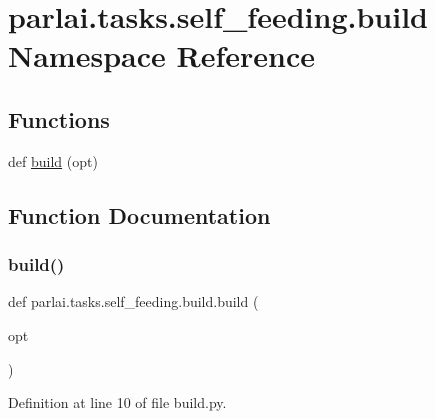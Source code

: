 \hypertarget{namespaceparlai_1_1tasks_1_1self__feeding_1_1build}{}\section{parlai.\+tasks.\+self\+\_\+feeding.\+build Namespace Reference}
\label{namespaceparlai_1_1tasks_1_1self__feeding_1_1build}
\subsection*{Functions}
\begin{DoxyCompactItemize}
\item 
def \hyperlink{namespaceparlai_1_1tasks_1_1self__feeding_1_1build_a59c71646a74f5762ffb019cf79fd9091}{build} (opt)
\end{DoxyCompactItemize}


\subsection{Function Documentation}
\mbox{\label{namespaceparlai_1_1tasks_1_1self__feeding_1_1build_a59c71646a74f5762ffb019cf79fd9091}} 
\subsubsection{\texorpdfstring{build()}{build()}}
{\footnotesize\ttfamily def parlai.\+tasks.\+self\+\_\+feeding.\+build.\+build (\begin{DoxyParamCaption}\item[{}]{opt }\end{DoxyParamCaption})}



Definition at line 10 of file build.\+py.

